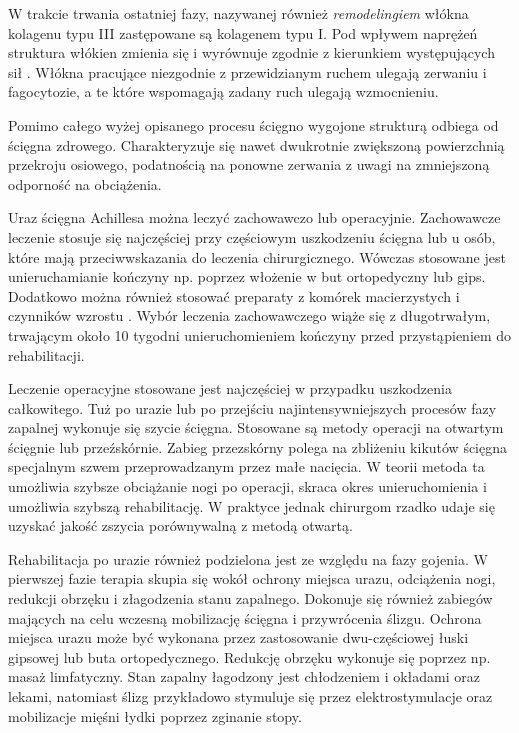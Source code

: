 W trakcie trwania ostatniej fazy, nazywanej również \textit{remodelingiem} włókna kolagenu typu III zastępowane są kolagenem typu I. Pod wpływem naprężeń struktura włókien zmienia się i wyrównuje zgodnie z kierunkiem występujących sił \cite{Yang2013}. Włókna pracujące niezgodnie z przewidzianym ruchem ulegają zerwaniu i fagocytozie, a te które wspomagają zadany ruch ulegają wzmocnieniu. 

Pomimo całego wyżej opisanego procesu ścięgno wygojone strukturą odbiega od ścięgna zdrowego. Charakteryzuje się nawet dwukrotnie zwiększoną powierzchnią przekroju osiowego, podatnością na ponowne zerwania z uwagi na zmniejszoną odporność na obciążenia. 

Uraz ścięgna Achillesa można leczyć zachowawczo lub operacyjnie. Zachowawcze leczenie stosuje się najczęściej przy częściowym uszkodzeniu ścięgna lub u osób, które mają przeciwwskazania do leczenia chirurgicznego. Wówczas stosowane jest unieruchamianie kończyny np. poprzez włożenie w but ortopedyczny lub gips. Dodatkowo można również stosować preparaty z komórek macierzystych i czynników wzrostu \cite{CMC}. Wybór leczenia zachowawczego wiąże się z długotrwałym, trwającym około 10 tygodni unieruchomieniem kończyny przed przystąpieniem do rehabilitacji.

Leczenie operacyjne stosowane jest najczęściej w przypadku uszkodzenia całkowitego. Tuż po urazie lub po przejściu najintensywniejszych procesów fazy zapalnej wykonuje się szycie ścięgna. Stosowane są metody operacji na otwartym ścięgnie lub przeźskórnie. Zabieg przezskórny polega na zbliżeniu kikutów ścięgna specjalnym szwem przeprowadzanym przez małe nacięcia. W teorii metoda ta umożliwia szybsze obciążanie nogi po operacji, skraca okres unieruchomienia i umożliwia szybszą rehabilitację. W praktyce jednak chirurgom rzadko udaje się uzyskać jakość zszycia porównywalną z metodą otwartą. 

Rehabilitacja po urazie również podzielona jest ze względu na fazy gojenia. W pierwszej fazie terapia skupia się wokół ochrony miejsca urazu, odciążenia nogi, redukcji obrzęku i złagodzenia stanu zapalnego. Dokonuje się również zabiegów mających na celu wczesną mobilizację ścięgna i przywrócenia ślizgu. Ochrona miejsca urazu może być wykonana przez zastosowanie dwu-częściowej łuski gipsowej lub buta ortopedycznego. Redukcję obrzęku wykonuje się poprzez np. masaż limfatyczny. Stan zapalny łagodzony jest chłodzeniem i okładami oraz lekami, natomiast ślizg przykładowo stymuluje się przez elektrostymulacje oraz mobilizacje mięśni łydki poprzez zginanie stopy.

